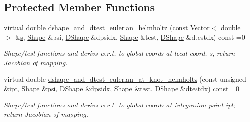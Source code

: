 \subsection*{Protected Member Functions}
\begin{DoxyCompactItemize}
\item 
virtual double \hyperlink{classoomph_1_1PMLHelmholtzEquationsBase_ad8b68169a39c90b30fb4340ce654a350}{dshape\+\_\+and\+\_\+dtest\+\_\+eulerian\+\_\+helmholtz} (const \hyperlink{classoomph_1_1Vector}{Vector}$<$ double $>$ \&\hyperlink{cfortran_8h_ab7123126e4885ef647dd9c6e3807a21c}{s}, \hyperlink{classoomph_1_1Shape}{Shape} \&psi, \hyperlink{classoomph_1_1DShape}{D\+Shape} \&dpsidx, \hyperlink{classoomph_1_1Shape}{Shape} \&test, \hyperlink{classoomph_1_1DShape}{D\+Shape} \&dtestdx) const =0
\begin{DoxyCompactList}\small\item\em Shape/test functions and derivs w.\+r.\+t. to global coords at local coord. s; return Jacobian of mapping. \end{DoxyCompactList}\item 
virtual double \hyperlink{classoomph_1_1PMLHelmholtzEquationsBase_aa283cd2415e7b9f9f3f7a71188403c8a}{dshape\+\_\+and\+\_\+dtest\+\_\+eulerian\+\_\+at\+\_\+knot\+\_\+helmholtz} (const unsigned \&ipt, \hyperlink{classoomph_1_1Shape}{Shape} \&psi, \hyperlink{classoomph_1_1DShape}{D\+Shape} \&dpsidx, \hyperlink{classoomph_1_1Shape}{Shape} \&test, \hyperlink{classoomph_1_1DShape}{D\+Shape} \&dtestdx) const =0
\begin{DoxyCompactList}\small\item\em Shape/test functions and derivs w.\+r.\+t. to global coords at integration point ipt; return Jacobian of mapping. \end{DoxyCompactList}\end{DoxyCompactItemize}
